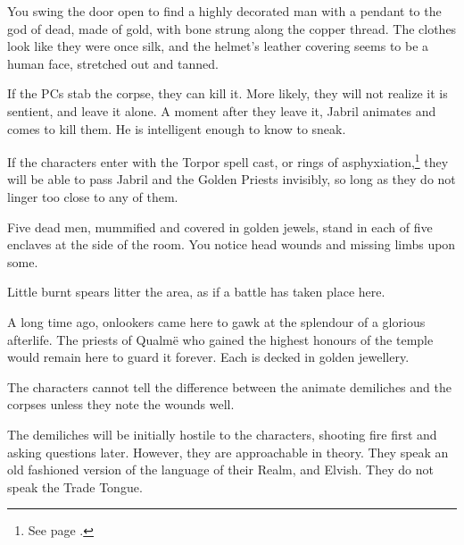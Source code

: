 \begin{multicols}{2}
\begin{boxtext}

	You swing the door open to find a highly decorated man with a pendant to the god of dead, made of gold, with bone strung along the copper thread.  The clothes look like they were once silk, and the helmet's leather covering seems to be a human face, stretched out and tanned.

\end{boxtext}

If the PCs stab the corpse, they can kill it.
More likely, they will not realize it is sentient, and leave it alone.
A moment after they leave it, Jabril animates and comes to kill them.
He is intelligent enough to know to sneak.



If the characters enter with the Torpor spell cast, or rings of asphyxiation,\footnote{See page \pageref{ring_asphyxiation}.} they will be able to pass Jabril and the Golden Priests invisibly, so long as they do not linger too close to any of them.


\begin{boxtext}

	Five dead men, mummified and covered in golden jewels, stand in each of five enclaves at the side of the room.
	You notice head wounds and missing limbs upon some.

	Little burnt spears litter the area, as if a battle has taken place here.

\end{boxtext}

A long time ago, onlookers came here to gawk at the splendour of a glorious afterlife.  The priests of Qualm\"{e} who gained the highest honours of the temple would remain here to guard it forever.  Each is decked in golden jewellery.


\demilich

The characters cannot tell the difference between the animate demiliches and the corpses unless they note the wounds well.

The demiliches will be initially hostile to the characters, shooting fire first and asking questions later.  However, they are approachable in theory.  They speak an old fashioned version of the language of their Realm, and Elvish.  They do not speak the Trade Tongue.


\end{multicols}
